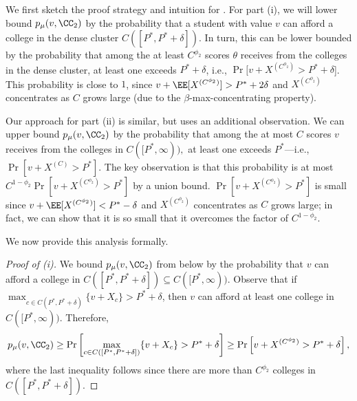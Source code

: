 \documentclass[10pt]{article}
\begin{document}
\begin{ReviewVerbatim}
We first sketch the proof strategy and intuition for . For part (i), we will lower bound $p_\mu(v, \CC_2)$ by the probability that a student with value $v$ can afford a college in the dense cluster $C([P^*, P^* + \delta]).$ In turn, this can be lower bounded by the probability that among the at least $C^{\phi_2}$ scores $\theta$ receives from the colleges in the dense cluster, at least one exceeds $P^* + \delta$, i.e., $\Pr[v + X^{(C^{\phi_2})} > P^* + \delta$]. This probability is close to $1$, since $v + \EE[X^{(C^{\phi_2})}] > P^* + 2\delta$ and $X^{(C^{\phi_2})}$ concentrates as $C$ grows large (due to the $\beta$-max-concentrating property).

Our approach for part (ii) is similar, but uses an additional observation. We can upper bound $p_\mu(v, \CC_2)$ by the probability that among the at most $C$ scores $v$ receives from the colleges in $C([P^*,\infty)),$ at least one exceeds $P^*$---i.e., $\Pr[v + X^{(C)} > P^*].$ The key observation is that this probability is at most $C^{1 - \phi_2}\Pr[v + X^{(C^{\phi_2})} > P^*]$ by a union bound. $\Pr[v + X^{(C^{\phi_2})} > P^*]$ is small since $v + \EE[X^{(C^{\phi_2})}] < P^* - \delta$ and $X^{(C^{\phi_2})}$ concentrates as $C$ grows large; in fact, we can show that it is so small that it overcomes the factor of $C^{1 - \phi_2}$.

We now provide this analysis formally.

\begin{proof}[Proof of (i)]
    We bound $p_\mu(v, \CC_2)$ from below by the probability that $v$ can afford a college in $C([P^*, P^* + \delta])\subseteq C([P^*, \infty)).$
    Observe that if $\max_{c\in C(P^*, P^* + \delta)} \{v + X_c\} > P^* + \delta$, then $v$ can afford at least one college in $C([P^*, \infty))$.
    Therefore,
    \begin{equation}
        p_\mu(v, \CC_2) \ge \Pr\left[\max_{c\in C([P^*, P^* + \delta])} \{v + X_c\} > P^* + \delta\right] \ge \Pr\left[v + X^{(C^{\phi_2})} > P^* + \delta\right],
    \end{equation}
    where the last inequality follows since there are more than $C^{\phi_2}$ colleges in $C([P^*, P^* + \delta])$.


\end{proof}
\end{ReviewVerbatim}
\end{document}
